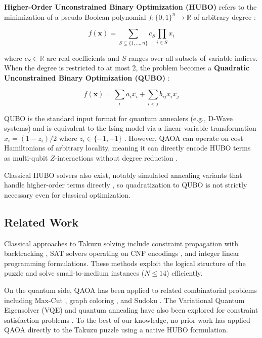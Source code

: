 \documentclass[eng]{ajceam-class}
\begin{document}
\textbf{Higher-Order Unconstrained Binary Optimization (HUBO)} refers to the minimization of a pseudo-Boolean polynomial $f: \{0,1\}^n \rightarrow \mathbb{R}$ of arbitrary degree \cite{boros2002pseudo}:

\begin{equation}
 f(\mathbf{x}) = \sum_{S \subseteq \{1,\ldots,n\}} c_S \prod_{i \in S} x_i
\end{equation}

where $c_S \in \mathbb{R}$ are real coefficients and $S$ ranges over all subsets of variable indices. When the degree is restricted to at most 2, the problem becomes a \textbf{Quadratic Unconstrained Binary Optimization (QUBO)} \cite{kochenberger2014qubo}:

\begin{equation}
 f(\mathbf{x}) = \sum_{i} a_i x_i + \sum_{i < j} b_{ij} x_i x_j
\end{equation}

QUBO is the standard input format for quantum annealers (e.g., D-Wave systems) and is equivalent to the Ising model via a linear variable transformation $x_i = (1 - z_i)/2$ where $z_i \in \{-1, +1\}$ \cite{lucas2014ising}. However, QAOA can operate on cost Hamiltonians of arbitrary locality, meaning it can directly encode HUBO terms as multi-qubit $Z$-interactions without degree reduction \cite{hadfield2019qaoa}.

Classical HUBO solvers also exist, notably simulated annealing variants that handle higher-order terms directly \cite{ishikawa2011transformation}, so quadratization to QUBO is not strictly necessary even for classical optimization.

\subsection{Related Work}

Classical approaches to Takuzu solving include constraint propagation with backtracking \cite{apt2003constraint}, SAT solvers operating on CNF encodings \cite{biere2009sat}, and integer linear programming formulations. These methods exploit the logical structure of the puzzle and solve small-to-medium instances ($N \leq 14$) efficiently.

On the quantum side, QAOA has been applied to related combinatorial problems including Max-Cut \cite{farhi2014qaoa}, graph coloring \cite{tabi2020quantum}, and Sudoku \cite{anis2022sudoku}. The Variational Quantum Eigensolver (VQE) and quantum annealing have also been explored for constraint satisfaction problems \cite{lucas2014ising}. To the best of our knowledge, no prior work has applied QAOA directly to the Takuzu puzzle using a native HUBO formulation.
\end{document}
